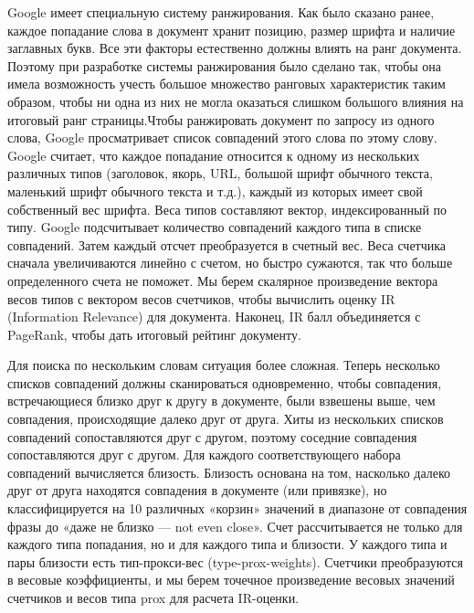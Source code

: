 Google имеет специальную систему ранжирования. Как было сказано ранее, каждое попадание слова в документ хранит позицию, размер шрифта и наличие заглавных букв. Все эти факторы естественно должны влиять на ранг документа. Поэтому при разработке системы ранжирования было сделано так, чтобы она имела возможность учесть большое множество ранговых характеристик таким образом, чтобы ни одна из них не могла оказаться слишком большого влияния на итоговый ранг страницы.Чтобы ранжировать документ по запросу из одного слова, Google просматривает список совпадений этого слова по этому слову. Google считает, что каждое попадание относится к одному из нескольких различных типов (заголовок, якорь, URL, большой шрифт обычного текста, маленький шрифт обычного текста и т.д.), каждый из которых имеет свой собственный вес шрифта. Веса типов составляют вектор, индексированный по типу. Google подсчитывает количество совпадений каждого типа в списке совпадений. Затем каждый отсчет преобразуется в счетный вес. Веса счетчика сначала увеличиваются линейно с счетом, но быстро сужаются, так что больше определенного счета не поможет. Мы берем скалярное произведение вектора весов типов с вектором весов счетчиков, чтобы вычислить оценку IR (Information Relevance) для документа. Наконец, IR балл объединяется с PageRank, чтобы дать итоговый рейтинг документу.

Для поиска по нескольким словам ситуация более сложная. Теперь несколько списков совпадений должны сканироваться одновременно, чтобы совпадения, встречающиеся близко друг к другу в документе, были взвешены выше, чем совпадения, происходящие далеко друг от друга. Хиты из нескольких списков совпадений сопоставляются друг с другом, поэтому соседние совпадения сопоставляются друг с другом. Для каждого соответствующего набора совпадений вычисляется близость. Близость основана на том, насколько далеко друг от друга находятся совпадения в документе (или привязке), но классифицируется на 10 различных «корзин» значений в диапазоне от совпадения фразы до «даже не близко — not even close». Счет рассчитывается не только для каждого типа попадания, но и для каждого типа и близости. У каждого типа и пары близости есть тип-прокси-вес (type-prox-weights). Счетчики преобразуются в весовые коэффициенты, и мы берем точечное произведение весовых значений счетчиков и весов типа prox для расчета IR-оценки.

